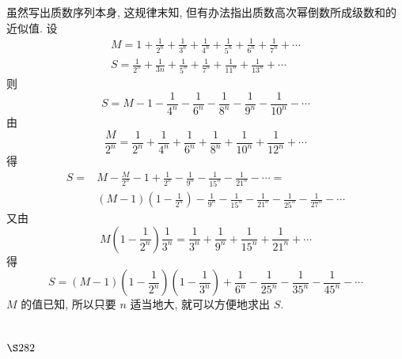 虽然写出质数序列本身, 这规律末知, 但有办法指出质数高次幂倒数所成级数和的 近似值. 设
\[
\begin{gathered}
M=1+\frac{1}{2^{n}}+\frac{1}{3^{n}}+\frac{1}{4^{n}}+\frac{1}{5^{n}}+\frac{1}{6^{n}}+\frac{1}{7^{n}}+\cdots \\
S=\frac{1}{2^{n}}+\frac{1}{3 n}+\frac{1}{5^{n}}+\frac{1}{7^{n}}+\frac{1}{11^{n}}+\frac{1}{13^{n}}+\cdots
\end{gathered}
\]
则
\[
S=M-1-\frac{1}{4^{n}}-\frac{1}{6^{n}}-\frac{1}{8^{n}}-\frac{1}{9^{n}}-\frac{1}{10^{n}}-\cdots
\]
由
\[
\frac{M}{2^{n}}=\frac{1}{2^{n}}+\frac{1}{4^{n}}+\frac{1}{6^{n}}+\frac{1}{8^{n}}+\frac{1}{10^{n}}+\frac{1}{12^{n}}+\cdots
\]
得
\[
\begin{aligned}
S= & M-\frac{M}{2^{n}}-1+\frac{1}{2^{n}}-\frac{1}{9^{n}}-\frac{1}{15^{n}}-\frac{1}{21^{n}}-\cdots= \\
& (M-1)\left(1-\frac{1}{2^{n}}\right)-\frac{1}{9^{n}}-\frac{1}{15^{n}}-\frac{1}{21^{n}}-\frac{1}{25^{n}}-\frac{1}{27^{n}}-\cdots
\end{aligned}
\]
又由
\[
M\left(1-\frac{1}{2^{n}}\right) \frac{1}{3^{n}}=\frac{1}{3^{n}}+\frac{1}{9^{n}}+\frac{1}{15^{n}}+\frac{1}{21^{n}}+\cdots
\]
得
\[
S=(M-1)\left(1-\frac{1}{2^{n}}\right)\left(1-\frac{1}{3^{n}}\right)+\frac{1}{6^{n}}-\frac{1}{25^{n}}-\frac{1}{35^{n}}-\frac{1}{45^{n}}-\cdots
\]
$M$ 的值已知, 所以只要 $n$ 适当地大, 就可以方便地求出 $S$.

\section{$\S 282$}

